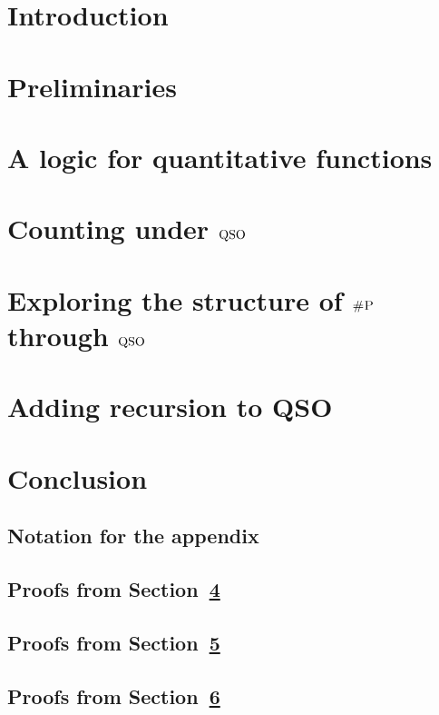 \documentclass[conference]{IEEEtran}
\begin{document}
\IEEEpeerreviewmaketitle

\section{Introduction}


\section{Preliminaries} \label{sec:preliminaries}


\section{A logic for quantitative functions} \label{sec:logic}


\section{Counting under ${\rm QSO}$} \label{sec:complexity}


\section{Exploring the structure of $\text{\sc \#P}$ through ${\rm QSO}$} \label{sec:syntactic}


\section{Adding recursion to QSO}\label{sec:beyond}


\section{Conclusion}









\newpage

\onecolumn
\appendix

\subsection{Notation for the appendix}


\bigskip

\subsection{Proofs from Section~\ref{sec:complexity}}


\subsection{Proofs from Section~\ref{sec:syntactic}}


\subsection{Proofs from Section~\ref{sec:beyond}}

\end{document}
